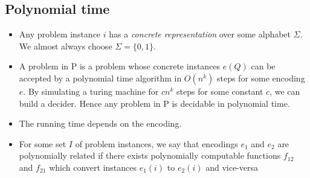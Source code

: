 \subsection{Polynomial time}
\begin{itemize}
\item Any problem instance $i$ has a \emph{concrete representation}
  over some alphabet $\Sigma$. We almost always choose $\Sigma =
  \{0,1\}$.
\item A problem in P is a problem whose concrete instances $e(Q)$ can
  be accepted by a polynomial time algorithm in $O(n^k)$ steps for
  some encoding $e$. By simulating a turing machine for $cn^k$ steps
  for some constant $c$, we can build a decider. Hence any problem in
  P is decidable in polynomial time.
\item The running time depends on the encoding.
\item For some set $I$ of problem instances, we say that encodings
  $e_1$ and $e_2$ are polynomially related if there exists
  polynomially computable functions $f_{12}$ and $f_{21}$ which
  convert instances $e_1(i)$ to $e_2(i)$ and vice-versa
\end{itemize}


\subsection{}

